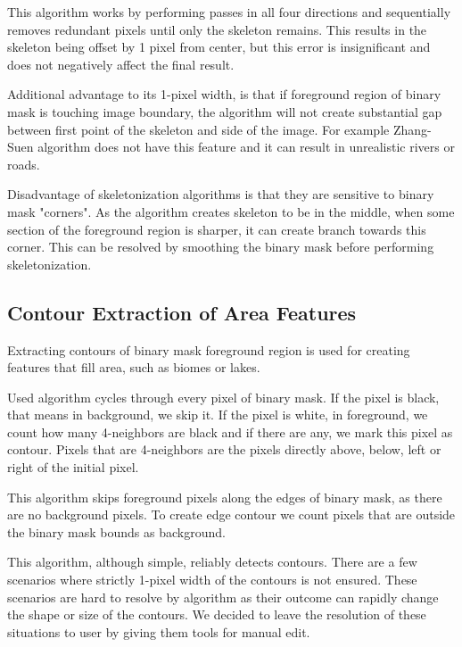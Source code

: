 
This algorithm works by performing passes in all four directions and sequentially removes redundant pixels until only the skeleton remains. This results in the skeleton being offset by 1 pixel from center, but this error is insignificant and does not negatively affect the final result. 

Additional advantage to its 1-pixel width, is that if foreground region of binary mask is touching image boundary, the algorithm will not create substantial gap between first point of the skeleton and side of the image. For example Zhang-Suen algorithm does not have this feature and it can result in unrealistic rivers or roads.



Disadvantage of skeletonization algorithms is that they are sensitive to binary mask "corners". As the algorithm creates skeleton to be in the middle, when some section of the foreground region is sharper, it can create branch towards this corner. This can be resolved by smoothing the binary mask before performing skeletonization.


\subsection{Contour Extraction of Area Features}

Extracting contours of binary mask foreground region is used for creating features that fill area, such as biomes or lakes. 

Used algorithm cycles through every pixel of binary mask. If the pixel is black, that means in background, we skip it. If the pixel is white, in foreground, we count how many 4-neighbors are black and if there are any, we mark this pixel as contour. Pixels that are 4-neighbors are the pixels directly above, below, left or right of the initial pixel.

This algorithm skips foreground pixels along the edges of binary mask, as there are no background pixels. To create edge contour we count pixels that are outside the binary mask bounds as background.


This algorithm, although simple, reliably detects contours. There are a few scenarios where strictly 1-pixel width of the contours is not ensured. These scenarios are hard to resolve by algorithm as their outcome can rapidly change the shape or size of the contours. We decided to leave the resolution of these situations to user by giving them tools for manual edit.

